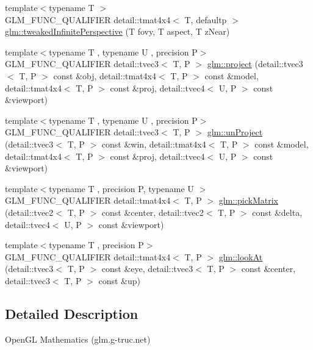 \begin{DoxyCompactItemize}
\item 
{\footnotesize template$<$typename T $>$ }\\G\+L\+M\+\_\+\+F\+U\+N\+C\+\_\+\+Q\+U\+A\+L\+I\+F\+I\+ER detail\+::tmat4x4$<$ T, defaultp $>$ \hyperlink{group__gtc__matrix__transform_ga9d67732836d71a79dc21eb8f87603cb7}{glm\+::tweaked\+Infinite\+Perspective} (T fovy, T aspect, T z\+Near)
\item 
{\footnotesize template$<$typename T , typename U , precision P$>$ }\\G\+L\+M\+\_\+\+F\+U\+N\+C\+\_\+\+Q\+U\+A\+L\+I\+F\+I\+ER detail\+::tvec3$<$ T, P $>$ \hyperlink{group__gtc__matrix__transform_ga41227b7b98882dcbaa8dab52df372c7b}{glm\+::project} (detail\+::tvec3$<$ T, P $>$ const \&obj, detail\+::tmat4x4$<$ T, P $>$ const \&model, detail\+::tmat4x4$<$ T, P $>$ const \&proj, detail\+::tvec4$<$ U, P $>$ const \&viewport)
\item 
{\footnotesize template$<$typename T , typename U , precision P$>$ }\\G\+L\+M\+\_\+\+F\+U\+N\+C\+\_\+\+Q\+U\+A\+L\+I\+F\+I\+ER detail\+::tvec3$<$ T, P $>$ \hyperlink{group__gtc__matrix__transform_ga4b0a9086d15e2a743ecd7b6128146af1}{glm\+::un\+Project} (detail\+::tvec3$<$ T, P $>$ const \&win, detail\+::tmat4x4$<$ T, P $>$ const \&model, detail\+::tmat4x4$<$ T, P $>$ const \&proj, detail\+::tvec4$<$ U, P $>$ const \&viewport)
\item 
{\footnotesize template$<$typename T , precision P, typename U $>$ }\\G\+L\+M\+\_\+\+F\+U\+N\+C\+\_\+\+Q\+U\+A\+L\+I\+F\+I\+ER detail\+::tmat4x4$<$ T, P $>$ \hyperlink{group__gtc__matrix__transform_ga0fb64f04bf5ad52523fcd4b10b46aff6}{glm\+::pick\+Matrix} (detail\+::tvec2$<$ T, P $>$ const \&center, detail\+::tvec2$<$ T, P $>$ const \&delta, detail\+::tvec4$<$ U, P $>$ const \&viewport)
\item 
{\footnotesize template$<$typename T , precision P$>$ }\\G\+L\+M\+\_\+\+F\+U\+N\+C\+\_\+\+Q\+U\+A\+L\+I\+F\+I\+ER detail\+::tmat4x4$<$ T, P $>$ \hyperlink{group__gtc__matrix__transform_ga454fdf3163c2779eeeeeb9d75907ce97}{glm\+::look\+At} (detail\+::tvec3$<$ T, P $>$ const \&eye, detail\+::tvec3$<$ T, P $>$ const \&center, detail\+::tvec3$<$ T, P $>$ const \&up)
\end{DoxyCompactItemize}


\subsection{Detailed Description}
Open\+GL Mathematics (glm.\+g-\/truc.\+net)

